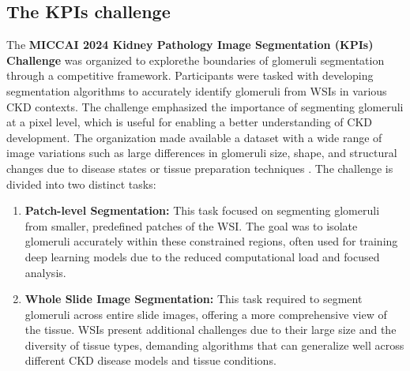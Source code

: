 \subsection*{The KPIs challenge}
The \textbf{MICCAI 2024 Kidney Pathology Image Segmentation (KPIs) Challenge} was organized to explorethe boundaries of glomeruli segmentation through a competitive framework. 
Participants were tasked with developing segmentation algorithms to accurately identify glomeruli from WSIs in various CKD contexts. 
The challenge emphasized the importance of segmenting glomeruli at a pixel level, which is useful for enabling a better understanding of CKD development. 
The organization made available a dataset with a wide range of image variations such as large differences in glomeruli size, shape, and structural changes due to disease states or tissue preparation techniques \cite{KPIs2024}.
The challenge is divided into two distinct tasks:
\begin{enumerate}
    \item \textbf{Patch-level Segmentation:} This task focused on segmenting glomeruli from smaller, predefined patches of the WSI. 
    The goal was to isolate glomeruli accurately within these constrained regions, often used for training deep learning models due to the reduced computational load and focused analysis.
    \item \textbf{Whole Slide Image Segmentation:} This task required to segment glomeruli across entire slide images, offering a more comprehensive view of the tissue. 
WSIs present additional challenges due to their large size and the diversity of tissue types, demanding algorithms that can generalize well across different CKD disease models and tissue conditions.
\end{enumerate}

